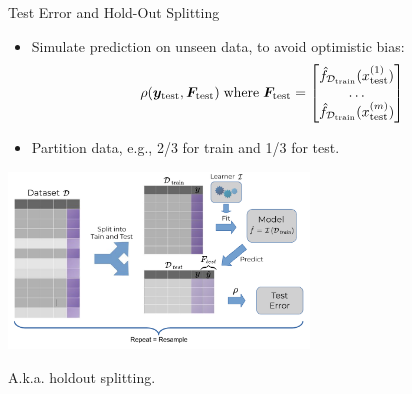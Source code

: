 \begin{vbframe}{Test Error and Hold-Out Splitting}

  \small
\begin{itemize}
  \item Simulate prediction on unseen data, to avoid optimistic bias:
\small
$$\rho(\yv_{\mathrm{test}}, \F_{\textrm{test}})\;\text{where}\; 
\F_{\textrm{test}} = \begin{bmatrix} 
\fhDtrain(\xi[1]_{\textrm{test}}) \\ 
\dots \\
\fhDtrain(\xi[m]_{\textrm{test}})
\end{bmatrix}$$ 
  \item Partition data, e.g., 2/3 for train and 1/3 for test.
\end{itemize}

\begin{center}

  \includegraphics[width=0.6\textwidth]{figure_man/test_error.pdf}

\end{center}
A.k.a. holdout splitting.

\end{vbframe}


